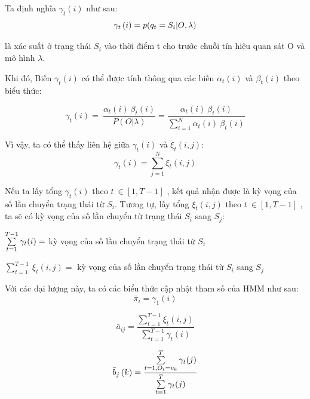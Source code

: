 \documentclass[13pt]{extreport}
\begin{document}
Ta định nghĩa  $\gamma_t(i)$ như sau:
$${\gamma _t}\left( i \right) = p{\rm{(}}{q_t} = {S_{i}}{\rm{|}}O,\lambda )$$

là xác suất ở trạng thái $S_i$ vào thời điểm t cho trước chuỗi tín hiệu quan sát O và mô hình $  \lambda  $. \par
Khi đó, Biến $  \gamma _{t} \left( i \right)  $
 có thể được tính thông qua các biến $  \alpha _{t} \left( i \right)  $
 và $  \beta _{t} \left( i \right)  $
 theo biểu thức: 

$$  \gamma _{t} \left( i \right) =~\frac{ \alpha _{t} \left( i \right) ~ \beta _{t} \left( i \right) }{P \left( O \vert  \lambda  \right) }=\frac{ \alpha _{t} \left( i \right) ~ \beta _{t} \left( i \right) }{\mathop \sum \limits_{i=1}^{N} \alpha _{t} \left( i \right) ~ \beta _{t} \left( i \right) } $$ \par

Vì vậy, ta có thể thấy liên hệ giữa $\gamma_t(i)$ và $ \xi _t(i,j)$: 
$$ \gamma_t(i)=\sum_{j=1}^N \xi_t(i,j) $$ \par
Nếu ta lấy tổng $  \gamma _{t} \left( i \right)  $
 theo $ t~ \in  \left[ 1,T-1 \right]  $
, kết quả nhận được là kỳ vọng của số lần chuyển trạng thái từ $S_i$. Tương tự, lấy tổng $  \xi _{t} \left( i,j \right)  $
 theo $ t~ \in  \left[ 1,T-1 \right]  $
, ta sẽ có kỳ vọng của số lần chuyển từ trạng thái $S_i$ sang $S_j$: \par
\begin{center}

$\mathop \sum \limits_{t = 1}^{T - 1} {\rm{}}{\gamma _t}(i) = $ kỳ vọng của số lần chuyển trạng thái từ $S_{i}$ 
 \par
$\mathop \sum \limits _{t=1}^{T-1}~ \xi _{t} \left( i,j \right) =$ kỳ vọng của số lần chuyển trạng thái từ $S_{i}$ sang $S_{j}~ $
 \par
 
\end{center}
Với các đại lượng này, ta có các biểu thức cập nhật tham số của HMM như sau:
\begin{equation}
{\bar \pi _i}  = \gamma _{1} \left( i \right)  
\end{equation}

\begin{equation}
{\bar a_{ij}} =\frac{ \mathop \sum \limits _{t=1}^{T-1} \xi _{t} \left( i,j \right) }{ \mathop \sum \limits _{t=1}^{T-1} \gamma _{t} \left( i \right) }
\end{equation}

\begin{equation}
{\bar b_j}\left( k \right) = \frac{{\mathop \sum \limits_{t = 1,{O_t} = {v_k}}^T {\gamma _t}(j)}}{{\mathop \sum \limits_{t = 1}^T {\rm{}}{\gamma _t}(j)}}
\end{equation}
\end{document}
